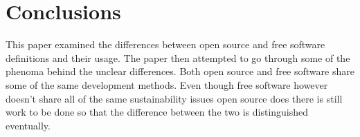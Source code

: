 \documentclass[conference]{IEEEtran}
\begin{document}
\section{Conclusions}
This paper examined the differences between open source and free software definitions and their usage. The paper then attempted to go through some of the phenoma behind the unclear differences. Both open source and free software share some of the same development methods. Even though free software however doesn't share all of the same sustainability issues open source does there is still work to be done so that the difference between the two is distinguished eventually.

{}
\end{document}
